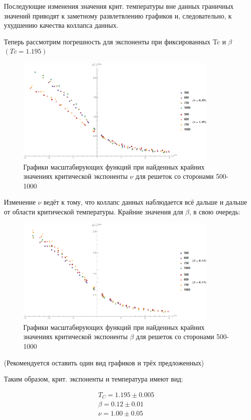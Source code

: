 Последующие изменения значения крит. температуры вне данных граничных значений приводят к заметному развлетвлению графиков и, следовательно, к ухудшению качества коллапса данных.

Теперь рассмотрим погрешность для экспоненты при фиксированных Tc и $\beta$ $(Tc = 1.195)$

\begin{figure}[!h]
    \centering
    \includegraphics[width=100mm]{Sections/Images/ErrV2_2.png}
    \caption{Графики масштабирующих функций при найденных крайних значениях критической экспоненты $\nu$ для решеток со сторонами 500-1000}
    \label{fig:ErrV2_2}
\end{figure}

Изменение $\nu$ ведёт к тому, что коллапс данных наблюдается всё дальше и дальше от области критической температуры. Крайние значения для $\beta$, в свою очередь:

\begin{figure}[!h]
    \centering
    \includegraphics[width=100mm]{Sections/Images/ErrB2_2.png}
    \caption{Графики масштабирующих функций при найденных крайних значениях критической экспоненты $\beta$ для решеток со сторонами 500-1000}
    \label{fig:DatColM2_2}
\end{figure}

(Рекомендуется оставить один вид графиков и трёх предложенных)

Таким образом, крит. экспоненты и температура имеют вид:

\begin{align*}
    T_{C} = 1.195 \pm 0.005 \\
    \beta = 0.12 \pm 0.01 \\
    \nu = 1.00 \pm 0.05
\end{align*}